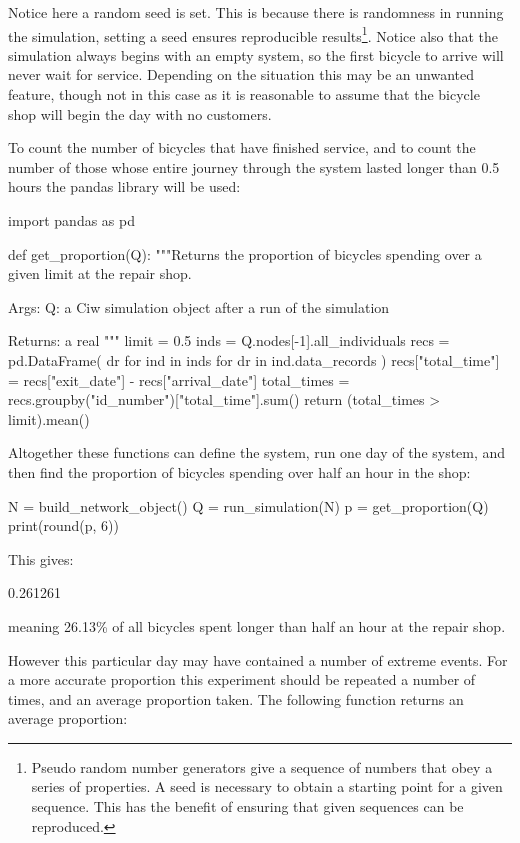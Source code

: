 Notice here a random seed is set. This is because there is randomness in running
the simulation, setting a seed ensures reproducible results\footnote{
Pseudo random number generators give a sequence of numbers that obey a series of
properties. A seed is necessary to obtain a starting point for a given sequence.
This has the benefit of ensuring that given sequences can be reproduced.
}.
Notice also that the simulation always begins with an empty system, so the first
bicycle to arrive will never wait for service. Depending on the situation this
may be an unwanted feature, though not in this case as it is reasonable to
assume that the bicycle shop will begin the day with no customers.

To count the number of bicycles that have finished service, and to
count the number of those whose entire journey through the system lasted longer
than 0.5 hours the pandas
library will be used:

\begin{pyin}
import pandas as pd


def get_proportion(Q):
    """Returns the proportion of bicycles spending over a given
    limit at the repair shop.

    Args:
        Q: a Ciw simulation object after a run of the
           simulation

    Returns:
        a real
    """
    limit = 0.5
    inds = Q.nodes[-1].all_individuals
    recs = pd.DataFrame(
        dr for ind in inds for dr in ind.data_records
    )
    recs["total_time"] = recs["exit_date"] - recs["arrival_date"]
    total_times = recs.groupby("id_number")["total_time"].sum()
    return (total_times > limit).mean()
\end{pyin}

Altogether these functions can define the system, run one day of the system, and
then find the proportion of bicycles spending over half an hour in the shop:

\begin{pyin}
N = build_network_object()
Q = run_simulation(N)
p = get_proportion(Q)
print(round(p, 6))
\end{pyin}

This gives:

\begin{pyout}
0.261261
\end{pyout}

meaning 26.13\% of all bicycles spent longer than half an hour at the repair
shop.

However this particular day may have contained a number of extreme events.
For a more accurate proportion this experiment should be repeated a number of
times, and an average proportion taken.
The following function returns an average proportion:

